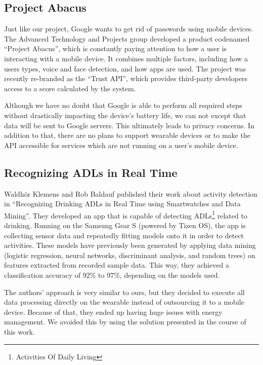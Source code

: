 \clearpage

\subsection{Project Abacus}
Just like our project, Google wants to get rid of passwords using mobile devices.
The Advanced Technology and Projects group developed a product codenamed ``Project Abacus'', which is constantly paying attention to how a user is interacting with a mobile device.
It combines multiple factors, including how a users types, voice and face detection, and how apps are used.
The project was recently re-branded as the ``Trust API'', which provides third-party developers access to a score calculated by the system.

Although we have no doubt that Google is able to perform all required steps without drastically impacting the device's battery life, we can not except that data will be sent to Google servers.
This ultimately leads to privacy concerns.
In addition to that, there are no plans to support wearable devices or to make the API accessible for services which are not running on a user's mobile device.

\subsection{Recognizing ADLs in Real Time}
Waldhör Klemens and Rob Baldauf published their work about activity detection in ``Recognizing Drinking ADLs in Real Time using Smartwatches and Data Mining''\cite{paper:drinkingadls}.
They developed an app that is capable of detecting ADLs\footnote{Activities Of Daily Living} related to drinking.
Running on the Samsung Gear S (powered by Tizen OS), the app is collecting sensor data and repeatedly fitting models onto it in order to detect activities.
These models have previously been generated by applying data mining (logistic regression, neural networks, discriminant analysis, and random trees) on features extracted from recorded sample data. This way, they achieved a classification accuracy of 92\% to 97\%, depending on the models used.

The authors' approach is very similar to ours, but they decided to execute all data processing directly on the wearable instead of outsourcing it to a mobile device.
Because of that, they ended up having huge issues with energy management. We avoided this by using the solution presented in the course of this work.

\clearpage
